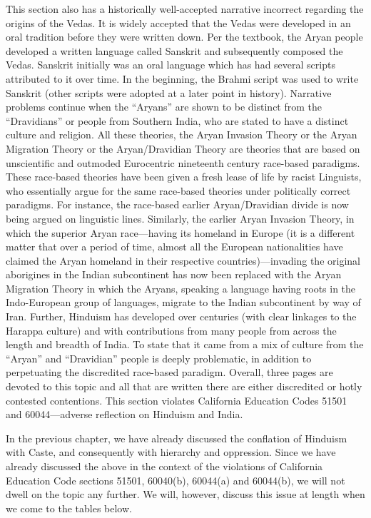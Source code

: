 This section also has a historically well-accepted narrative incorrect regarding the origins of the Vedas. It is widely accepted that the Vedas were developed in an oral tradition before they were written down. Per the textbook, the Aryan people developed a written language called Sanskrit and subsequently composed the Vedas. Sanskrit initially was an oral language which has had several scripts attributed to it over time. In the beginning, the Brahmi script was used to write Sanskrit (other scripts were adopted at a later point in history). Narrative problems continue when the “Aryans” are shown to be distinct from the “Dravidians” or people from Southern India, who are stated to have a distinct culture and religion. All these theories, the Aryan Invasion Theory or the Aryan Migration Theory or the Aryan/Dravidian Theory are theories that are based on unscientific and outmoded Eurocentric nineteenth century race-based paradigms. These race-based theories have been given a fresh lease of life by racist Linguists, who essentially argue for the same race-based theories under politically correct paradigms. For instance, the race-based earlier Aryan/Dravidian divide is now being argued on linguistic lines. Similarly, the earlier Aryan Invasion Theory, in which the superior Aryan race—having its homeland in Europe (it is a different matter that over a period of time, almost all the European nationalities have claimed the Aryan homeland in their respective countries)—invading the original aborigines in the Indian subcontinent has now been replaced with the Aryan Migration Theory in which the Aryans, speaking a language having roots in the Indo-European group of languages, migrate to the Indian subcontinent by way of Iran. Further, Hinduism has developed over centuries (with clear linkages to the Harappa culture) and with contributions from many people from across the length and breadth of India. To state that it came from a mix of culture from the “Aryan” and “Dravidian” people is deeply problematic, in addition to perpetuating the discredited race-based paradigm. Overall, three pages are devoted to this topic and all that are written there are either discredited or hotly contested contentions. This section violates California Education Codes 51501 and 60044—adverse reflection on Hinduism and India.  

In the previous chapter, we have already discussed the conflation of Hinduism with Caste, and consequently with hierarchy and oppression. Since we have already discussed the above in the context of the violations of California Education Code sections 51501, 60040(b), 60044(a) and 60044(b), we will not dwell on the topic any further. We will, however, discuss this issue at length when we come to the tables below.  

